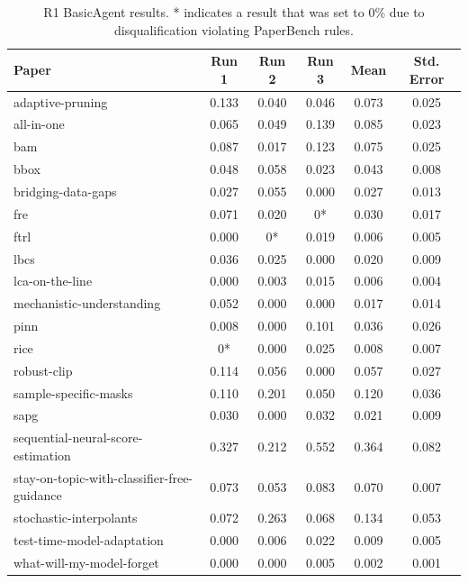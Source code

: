 \documentclass{article}
\theoremstyle{plain}
\theoremstyle{definition}
\theoremstyle{remark}
\begin{document}
\begin{table}[tb]
\caption{R1 BasicAgent results. * indicates a result that was set to 0\% due to disqualification violating PaperBench rules.}
\label{tab:r1-results-basic}
\vskip 0.15in
\begin{center}
\begin{small}
\begin{sc}
\begin{tabular}{l c c c c c}
\toprule
\textbf{Paper} & \textbf{Run 1} & \textbf{Run 2} & \textbf{Run 3} & \textbf{Mean} & \textbf{Std. Error} \\
\midrule
adaptive-pruning & 0.133 & 0.040 & 0.046 & 0.073 & 0.025 \\
all-in-one & 0.065 & 0.049 & 0.139 & 0.085 & 0.023 \\
bam & 0.087 & 0.017 & 0.123 & 0.075 & 0.025 \\
bbox & 0.048 & 0.058 & 0.023 & 0.043 & 0.008 \\
bridging-data-gaps & 0.027 & 0.055 & 0.000 & 0.027 & 0.013 \\
fre & 0.071 & 0.020 & 0* & 0.030 & 0.017 \\
ftrl & 0.000 & 0* & 0.019 & 0.006 & 0.005 \\
lbcs & 0.036 & 0.025 & 0.000 & 0.020 & 0.009 \\
lca-on-the-line & 0.000 & 0.003 & 0.015 & 0.006 & 0.004 \\
mechanistic-understanding & 0.052 & 0.000 & 0.000 & 0.017 & 0.014 \\
pinn & 0.008 & 0.000 & 0.101 & 0.036 & 0.026 \\
rice & 0* & 0.000 & 0.025 & 0.008 & 0.007 \\
robust-clip & 0.114 & 0.056 & 0.000 & 0.057 & 0.027 \\
sample-specific-masks & 0.110 & 0.201 & 0.050 & 0.120 & 0.036 \\
sapg & 0.030 & 0.000 & 0.032 & 0.021 & 0.009 \\
sequential-neural-score-estimation & 0.327 & 0.212 & 0.552 & 0.364 & 0.082 \\
stay-on-topic-with-classifier-free-guidance & 0.073 & 0.053 & 0.083 & 0.070 & 0.007 \\
stochastic-interpolants & 0.072 & 0.263 & 0.068 & 0.134 & 0.053 \\
test-time-model-adaptation & 0.000 & 0.006 & 0.022 & 0.009 & 0.005 \\
what-will-my-model-forget & 0.000 & 0.000 & 0.005 & 0.002 & 0.001 \\
\bottomrule
\end{tabular}
\end{sc}
\end{small}
\end{center}
\vskip -0.1in
\end{table}
\end{document}
